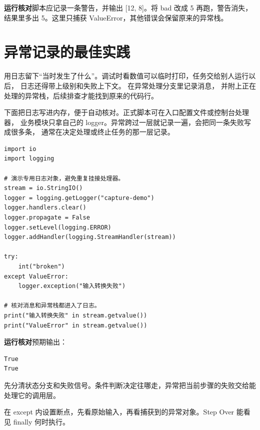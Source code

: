 \textbf{运行核对}\enspace 脚本应记录一条警告，并输出 [12, 8]。将 bad 改成 5 再跑，警告消失，结果里多出 5。这里只捕获 ValueError，其他错误会保留原来的异常栈。

\section{异常记录的最佳实践}

用日志留下“当时发生了什么”。调试时看数值可以临时打印，任务交给别人运行以后，
日志还得带上级别和失败上下文。 在异常处理分支里记录消息，
并附上正在处理的异常栈，后续排查才能找到原来的代码行。

下面把日志写进内存，便于自动核对。正式脚本可在入口配置文件或控制台处理器，
业务模块只拿自己的 logger。异常跨过一层就记录一遍，会把同一条失败写成很多条，
通常在决定处理或终止任务的那一层记录。


\begin{lstlisting}[title={\code{capture_error.py}}]
import io
import logging

# 演示专用日志对象，避免重复挂接处理器。
stream = io.StringIO()
logger = logging.getLogger("capture-demo")
logger.handlers.clear()
logger.propagate = False
logger.setLevel(logging.ERROR)
logger.addHandler(logging.StreamHandler(stream))

try:
    int("broken")
except ValueError:
    logger.exception("输入转换失败")

# 核对消息和异常栈都进入了日志。
print("输入转换失败" in stream.getvalue())
print("ValueError" in stream.getvalue())
\end{lstlisting}


\textbf{运行核对}\enspace 预期输出：
\begin{lstlisting}[language={},numbers=none]
True
True
\end{lstlisting}

\par

\begin{myunderstanding}
先分清状态分支和失败信号。条件判断决定往哪走，异常把当前步骤的失败交给能处理它的调用层。
\end{myunderstanding}

\begin{pycharmpractice}
在 except 内设置断点，先看原始输入，再看捕获到的异常对象。Step Over 能看见 finally 何时执行。
\end{pycharmpractice}

